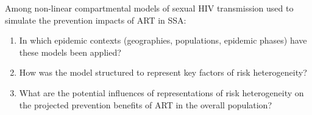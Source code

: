 Among non-linear compartmental models of sexual HIV transmission
used to simulate the prevention impacts of ART in SSA:
\begin{enumerate}
\item\label{rq:1}
      In which epidemic contexts (geographies, populations, epidemic phases)
      have these models been applied?
\item\label{rq:2}
      How was the model structured to represent key factors of risk heterogeneity?
\item\label{rq:3}
      What are the potential influences of representations of risk heterogeneity
      on the projected prevention benefits of ART in the overall population?
\end{enumerate}